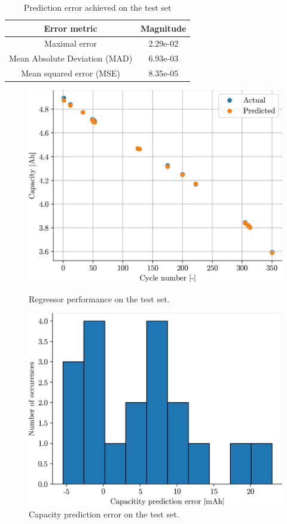 \begin{table}[]
    \centering
    \begin{tabular}{c|c}
        Error metric & Magnitude \\\hline
        Maximal error                  & 2.29e-02 \\
        Mean Absolute Deviation (MAD)  & 6.93e-03 \\
        Mean squared error (MSE)       & 8.35e-05 \\
    \end{tabular}
    \caption{Prediction error achieved on the test set}
    \label{tab:12-test-error}
\end{table}




\begin{figure}
\centering
\begin{minipage}{0.49\textwidth}
    \centering
    \includegraphics[width=\linewidth]{figures/12/test.jpg}
    \caption{Regressor performance on the test set.}
    \label{fig:12-pred}
\end{minipage}
\hfill
\begin{minipage}{0.49\textwidth}
    \centering
    \includegraphics[width=\linewidth]{figures/12/pred-error-hist.jpg}
    \caption{Capacity prediction error on the test set.}
    \label{fig:12-pred-error-hist}
\end{minipage}
\end{figure}


